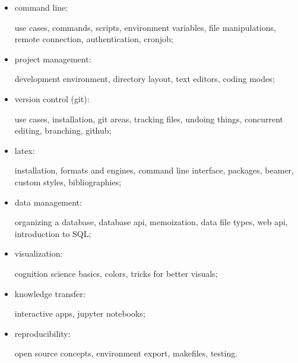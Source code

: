 \documentclass[12pt]{article}
\begin{document}
\begin{itemize}[topsep=0pt, itemsep=4pt, partopsep=0pt, parsep=0pt]
    \item command line:\par
        use cases, commands, scripts, environment variables, file manipulations, remote connection, authentication, cronjob;
    \item project management:\par
        development environment, directory layout, text editors, coding modes;
    \item version control (git):\par
        use cases, installation, git areas, tracking files, undoing things, concurrent editing, branching, github;
    \item latex:\par
        installation, formats and engines, command line interface, packages, beamer, custom styles, bibliographies;
    \item data management:\par
        organizing a database, database api, memoization, data file types, web api, introduction to SQL;
    \item visualization:\par
        cognition science basics, colors, tricks for better visuals;
    \item knowledge transfer:\par
        interactive apps, jupyter notebooks;
    \item reproducibility:\par
        open source concepts, environment export, makefiles, testing.
\end{itemize}

\end{document}

